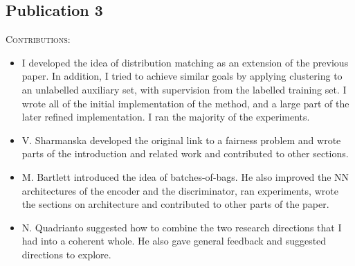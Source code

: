 \subsection{Publication 3}
\begin{refsection}[allreferences]
    \nocite{kehrenberg2020zeroshot}
    \printbibliography[heading=none]
\end{refsection}%
\noindent\textsc{Contributions:}
\begin{itemize}
  \item I developed the idea of distribution matching as an extension of the previous paper.
    In addition, I tried to achieve similar goals by applying clustering to an unlabelled auxiliary set,
    with supervision from the labelled training set.
    I wrote all of the initial implementation of the method, and a large part of the later refined implementation.
    I ran the majority of the experiments.
  \item V. Sharmanska developed the original link to a fairness problem
    and wrote parts of the introduction and related work and contributed to other sections.
  \item M. Bartlett introduced the idea of batches-of-bags.
    He also improved the \ac{NN} architectures of the encoder and the discriminator,
    ran experiments, wrote the sections on architecture and contributed to other parts of the paper.
  \item N. Quadrianto suggested how to combine the two research directions that I had into a coherent whole.
    He also gave general feedback and suggested directions to explore.
\end{itemize}
